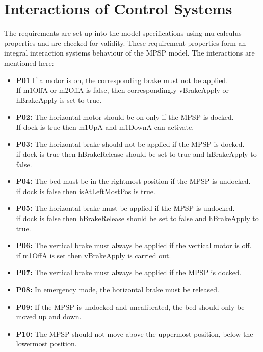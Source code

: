 \label{task3}
\section{Interactions of Control Systems}
The requirements are set up into the model specifications using mu-calculus properties and are checked for validity. These requirement properties form an integral interaction systems behaviour of the MPSP model. The interactions are mentioned here:

\begin{itemize}
    \item \textbf{P01} If a motor is on, the corresponding brake must not be applied. \\
        If m1OffA or m2OffA is false, then correspondingly vBrakeApply or hBrakeApply is set to true.
    \item \textbf{P02:} The horizontal motor should be on only if the MPSP is docked. \\
        If dock is true then m1UpA and m1DownA can activate.
    \item \textbf{P03:} The horizontal brake should not be applied if the MPSP is docked. \\ 
        if dock is true then hBrakeRelease should be set to true and hBrakeApply to false.
    \item \textbf{P04:} The bed must be in the rightmost position if the MPSP is  undocked. \\ 
        if dock is false then isAtLeftMostPos is true.
    \item \textbf{P05:} The horizontal brake must be applied if the MPSP is undocked. \\
        if dock is false then hBrakeRelease should be set to false and hBrakeApply to true.
    \item \textbf{P06:} The vertical brake must always be applied if the vertical motor is off. \\
        if m1OffA is set then vBrakeApply is carried out.
    \item \textbf{P07:} The vertical brake must always be applied if the MPSP is docked. \\ 
        
    \item \textbf{P08:} In emergency mode, the horizontal brake must be released. \\
    \item \textbf{P09:} If the MPSP is undocked and uncalibrated, the bed should only be moved up and down. \\
    \item \textbf{P10:} The MPSP should not move above the uppermost position, below the lowermost position. \\
\end{itemize}

